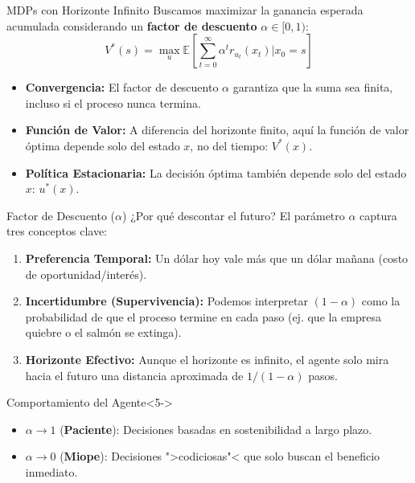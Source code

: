 \documentclass[xcolor=dvipsnames]{beamer}
\begin{document}
\begin{frame}{MDPs con Horizonte Infinito}
Buscamos maximizar la ganancia esperada acumulada considerando un \textbf{factor de descuento} $\alpha \in [0, 1)$:
\[ V^*(s) = \max_u \mathbb{E} \left[ \sum_{t=0}^\infty \alpha^t r_{u_t}(x_t) \bigg| x_0 = s \right] \]

\begin{itemize}
    \item<2-> \textbf{Convergencia:} El factor de descuento $\alpha$ garantiza que la suma sea finita, incluso si el proceso nunca termina.
    \item<3-> \textbf{Funci\'on de Valor:}  A diferencia del horizonte finito, aqu\'i la funci\'on de valor \'optima depende solo del estado $x$, no del tiempo: $V^*(x)$.
    \item<4-> \textbf{Pol\'itica Estacionaria:} La decisi\'on \'optima tambi\'en depende solo del estado $x$: $u^*(x)$.
\end{itemize}
\end{frame}

\begin{frame}{Factor de Descuento ($\alpha$)}
¿Por qu\'e descontar el futuro? El par\'ametro $\alpha$ captura tres conceptos clave:

\begin{enumerate}
    \item<2-> \textbf{Preferencia Temporal:} Un d\'olar hoy vale m\'as que un d\'olar ma\~nana (costo de oportunidad/inter\'es).
    \item<3-> \textbf{Incertidumbre (Supervivencia):} Podemos interpretar $(1-\alpha)$ como la probabilidad de que el proceso termine en cada paso (ej. que la empresa quiebre o el salm\'on se extinga).
    \item<4-> \textbf{Horizonte Efectivo:} Aunque el horizonte es infinito, el agente solo mira hacia el futuro una distancia aproximada de $1/(1-\alpha)$ pasos.
\end{enumerate}

\vspace{0.3cm}
\begin{exampleblock}{Comportamiento del Agente}<5->
    \begin{itemize}
        \item $\alpha \to 1$ (\textbf{Paciente}): Decisiones basadas en sostenibilidad a largo plazo.
        \item $\alpha \to 0$ (\textbf{Miope}): Decisiones ">codiciosas"< que solo buscan el beneficio inmediato.
    \end{itemize}
\end{exampleblock}
\end{frame}
\end{document}
